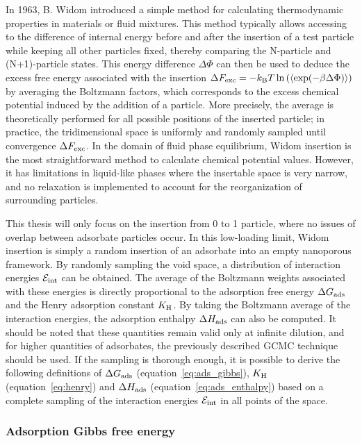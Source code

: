 \documentclass[main.tex]{subfiles}
\begin{document}
In 1963, B. Widom introduced a simple method for calculating thermodynamic properties in materials or fluid mixtures.\autocite{Widom1963} This method typically allows accessing to the difference of internal energy before and after the insertion of a test particle while keeping all other particles fixed, thereby comparing the N-particle and (N+1)-particle states. This energy difference $\Delta \Phi$ can then be used to deduce the excess free energy associated with the insertion $\Delta F_{\text{exc}} = -k_{\text{B}} T \ln\left(\langle \exp(- \beta\Delta \Phi) \rangle\right)$ by averaging the Boltzmann factors, which corresponds to the excess chemical potential induced by the addition of a particle. More precisely, the average is theoretically performed for all possible positions of the inserted particle; in practice, the tridimensional space is uniformly and randomly sampled until convergence $\Delta F_{\text{exc}}$. In the domain of fluid phase equilibrium, Widom insertion is the most straightforward method to calculate chemical potential values. However, it has limitations in liquid-like phases where the insertable space is very narrow, and no relaxation is implemented to account for the reorganization of surrounding particles.\autocite{Nezbeda_1991} 

This thesis will only focus on the insertion from 0 to 1 particle, where no issues of overlap between adsorbate particles occur. In this low-loading limit, Widom insertion is simply a random insertion of an adsorbate into an empty nanoporous framework. By randomly sampling the void space, a distribution of interaction energies $\mathcal{E}_{\text{int}}$ can be obtained. The average of the Boltzmann weights associated with these energies is directly proportional to the adsorption free energy $\Delta G_{\text{ads}}$ and the Henry adsorption constant $K_{\text{H}}$. By taking the Boltzmann average of the interaction energies, the adsorption enthalpy $\Delta H_{\text{ads}}$ can also be computed. It should be noted that these quantities remain valid only at infinite dilution, and for higher quantities of adsorbates, the previously described GCMC technique should be used. If the sampling is thorough enough, it is possible to derive the following definitions of $\Delta G_{\text{ads}}$ (equation~\ref{eq:ads_gibbs}), $K_{\text{H}}$ (equation~\ref{eq:henry}) and $\Delta H_{\text{ads}}$ (equation~\ref{eq:ads_enthalpy}) based on a complete sampling of the interaction energies $\mathcal{E}_{\text{int}}$ in all points of the space. 

\subsubsection{Adsorption Gibbs free energy}
\end{document}

